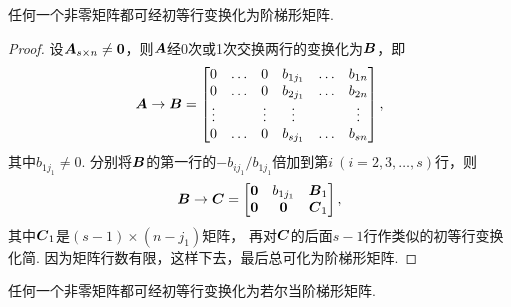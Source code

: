 \begin{lemma}
任何一个非零矩阵都可经初等行变换化为阶梯形矩阵.
\begin{proof}
设\(\boldsymbol{A}_{s \times n} \neq \boldsymbol0\)，则\(\boldsymbol{A}\)经0次或1次交换两行的变换化为\(\boldsymbol{B}\)，即\begin{equation*}
	\boldsymbol{A} \to \boldsymbol{B} = \begin{bmatrix}
		0 & \dots & 0 & b_{1 j_1} & \dots & b_{1n} \\
		0 & \dots & 0 & b_{2 j_1} & \dots & b_{2n} \\
		\vdots & & \vdots & \vdots & & \vdots \\
		0 & \dots & 0 & b_{s j_1} & \dots & b_{sn}
	\end{bmatrix},
\end{equation*}
其中\(b_{1 j_1} \neq 0\).
分别将\(\boldsymbol{B}\)的第一行的\(-b_{i j_1}/b_{1 j_1}\)倍加到第\(i\ (i=2,3,\dotsc,s)\)行，则\begin{equation*}
	\boldsymbol{B} \to \boldsymbol{C} = \begin{bmatrix}
		\boldsymbol0 & b_{1 j_1} & \boldsymbol{B}_1 \\
		\boldsymbol0 & \boldsymbol0 & \boldsymbol{C}_1
	\end{bmatrix},
\end{equation*}
其中\(\boldsymbol{C}_1\)是\((s-1)\times(n-j_1)\)矩阵，
再对\(\boldsymbol{C}\)的后面\(s-1\)行作类似的初等行变换化简.
因为矩阵行数有限，这样下去，最后总可化为阶梯形矩阵.
\end{proof}
\end{lemma}

\begin{corollary}\label{theorem:线性方程组.非零矩阵可经初等行变换化为若尔当阶梯形矩阵}
任何一个非零矩阵都可经初等行变换化为若尔当阶梯形矩阵.
\end{corollary}


